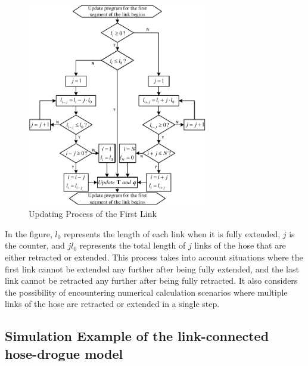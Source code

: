 \begin{figure}[th]
	\centering
	\includegraphics[width=0.7\textwidth]{Figures/Figs_Ch3/fig7.pdf}
	\caption{Updating Process of the First Link}\label{fig4.7}
\end{figure}

In the figure, ${l_0}$ represents the length of each link when it is fully extended, $j$ is the counter, and $j{l_0}$ represents the total length of $j$ links of the hose that are either retracted or extended. This process takes into account situations where the first link cannot be extended any further after being fully extended, and the last link cannot be retracted any further after being fully retracted. It also considers the possibility of encountering numerical calculation scenarios where multiple links of the hose are retracted or extended in a single step.

\subsection{Simulation Example of the link-connected hose-drogue model}

